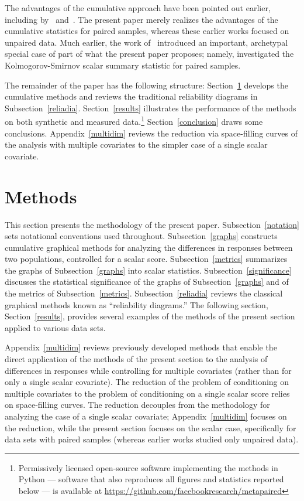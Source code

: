 \documentclass{article}
\begin{document}
The advantages of the cumulative approach have been pointed out earlier,
including by~\cite{arrieta-ibarra-gujral-tannen-tygert-xu}
and~\cite{tygert_multidim,tygert_full,tygert_two,tygert_pvals}.
The present paper merely realizes the advantages of the cumulative statistics
for paired samples, whereas these earlier works focused on unpaired data.
Much earlier, the work of~\cite{delgado} introduced an important, archetypal
special case of part of what the present paper proposes; namely,
\cite{delgado} investigated the Kolmogorov-Smirnov scalar summary statistic
for paired samples.

The remainder of the paper has the following structure:
Section~\ref{methods} develops the cumulative methods
and reviews the traditional reliability diagrams in Subsection~\ref{reliadia}.
Section~\ref{results} illustrates the performance of the methods
on both synthetic and measured data.\footnote{Permissively licensed
open-source software implementing the methods in Python --- software that
also reproduces all figures and statistics reported below --- is available
at \url{https://github.com/facebookresearch/metapaired}}
Section~\ref{conclusion} draws some conclusions.
Appendix~\ref{multidim} reviews the reduction via space-filling curves
of the analysis with multiple covariates to the simpler case
of a single scalar covariate.



\section{Methods}
\label{methods}

This section presents the methodology of the present paper.
Subsection~\ref{notation} sets notational conventions used throughout.
Subsection~\ref{graphs} constructs cumulative graphical methods for analyzing
the differences in responses between two populations,
controlled for a scalar score.
Subsection~\ref{metrics} summarizes the graphs of Subsection~\ref{graphs}
into scalar statistics.
Subsection~\ref{significance} discusses the statistical significance
of the graphs of Subsection~\ref{graphs} and of the metrics
of Subsection~\ref{metrics}.
Subsection~\ref{reliadia} reviews the classical graphical methods
known as ``reliability diagrams.''
The following section, Section~\ref{results}, provides several examples
of the methods of the present section applied to various data sets.

Appendix~\ref{multidim} reviews previously developed methods that enable
the direct application of the methods of the present section
to the analysis of differences in responses
while controlling for multiple covariates
(rather than for only a single scalar covariate).
The reduction of the problem of conditioning on multiple covariates
to the problem of conditioning on a single scalar score
relies on space-filling curves.
The reduction decouples from the methodology for analyzing the case
of a single scalar covariate; Appendix~\ref{multidim} focuses on the reduction,
while the present section focuses on the scalar case,
specifically for data sets with paired samples
(whereas earlier works studied only unpaired data).
\end{document}

